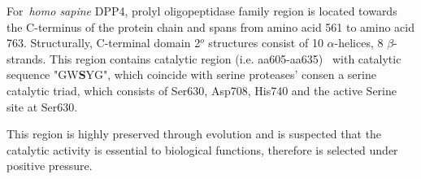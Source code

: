 For~\textit{homo sapine} DPP4, prolyl oligopeptidase family region is located towards the C-terminus of the protein chain and spans from amino acid 561 to amino acid 763. Structurally, C-terminal domain 2$^{o}$ structures consist of 10 $\alpha$-helices, 8 $\beta$-strands. This region contains catalytic region (i.e. aa605-aa635)~\cite{Rawlings1991,Barrett1992,Polgár1992,Rawlings1994} with catalytic sequence "GW\textbf{S}YG", which coincide with serine proteases' consen a serine catalytic triad, which consists of Ser630, Asp708, His740 and the active Serine site at Ser630. \par
This region is highly preserved through evolution and is suspected that the catalytic activity is essential to biological functions, therefore is selected under positive pressure. 